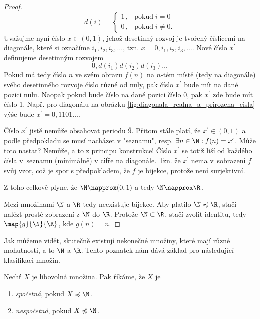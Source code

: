 \begin{proof}
    \begin{equation*}
        d(i)=\left\{
        \begin{array}{ll}
            1\,, & \text{pokud}\;i=0\\
            0\,, & \text{pokud}\;i\neq 0.
        \end{array}
        \right.
    \end{equation*}
    Uvažujme nyní číslo $x\in(0,1)$, jehož desetinný rozvoj je tvořený číslicemi na diagonále, které si označíme $i_1,i_2,i_3,\dots$, tzn. $x=0,i_1,i_2,i_3,\dots$. Nové číslo $x^\prime$ definujeme desetinným rozvojem
    \begin{equation*}
        0,d(i_1)d(i_2)d(i_3)\dots
    \end{equation*}
    Pokud má tedy číslo $n$ ve svém obrazu $f(n)$ na $n$-tém místě (tedy na diagonále) svého desetinného rozvoje číslo různé od nuly, pak číslo $x^\prime$ bude mít na dané pozici nulu. Naopak pokud bude číslo na dané pozici číslo 0, pak $x^\prime$ zde bude mít číslo 1. Např. pro diagonálu na obrázku \ref{fig:diagonala_realna_a_prirozena_cisla} výše bude $x^\prime=0,1101\dots$.\par
    Číslo $x^\prime$ jistě nemůže obsahovat periodu $\overline{9}$. Přitom stále platí, že $x^\prime\in(0,1)$ a podle předpokladu se musí nacházet v "seznamu", resp. $\exists n\in\N: f(n)=x^\prime$. Může toto nastat? Nemůže, a to z principu konstrukce! Číslo $x^\prime$ se totiž liší od každého čísla v~seznamu (minimálně) v cifře na diagonále. Tzn. že $x^\prime$ nema v~sobrazení $f$ svůj vzor, což je spor s předpokladem, že $f$ je bijekce, protože není surjektivní.\par
    Z toho celkově plyne, že $\N\napprox(0,1)$ a tedy $\N\napprox\R$.
    \medskip

    Mezi množinami $\N$ a $\R$ tedy neexistuje bijekce. Aby platilo $\N\preccurlyeq\R$, stačí nalézt prosté zobrazení z $\N$ do $\R$. Protože $\N\subset\R$, stačí zvolit identitu, tedy $\map{g}{\N}{\R}$, kde $g(n)=n$.
\end{proof}
\needspace{1cm}
Jak můžeme vidět, skutečně existují nekonečné množiny, které mají různé mohutnosti, a to $\N$ a $\R$.  Tento poznatek nám dává základ pro následující klasifikaci množin.
\begin{definition}\label{def:spocetna_a_nespocetna_mnozina}
    Nechť $X$ je libovolná množina. Pak říkáme, že $X$ je
    \begin{enumerate}[label=(\roman*)]
        \item \emph{spočetná}, pokud $X\preccurlyeq\N$.
        \item \emph{nespočetná}, pokud $X\not\preccurlyeq\N$.
    \end{enumerate}
\end{definition}
